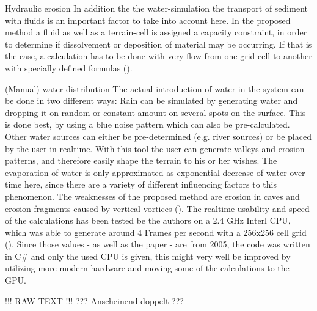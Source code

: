 Hydraulic erosion
In addition the the water-simulation the transport of sediment with fluids is an important factor to take into account here. In the proposed method a fluid as well as a terrain-cell is assigned a capacity constraint, in order to determine if dissolvement or deposition of material may be occurring. If that is the case, a calculation has to be done with very flow from one grid-cell to another with specially defined formulas ().

(Manual) water distribution
The actual introduction of water in the system can be done in two different ways:
Rain can be simulated by generating water and dropping it on random or constant amount on several spots on the surface. This is done best, by using a blue noise pattern which can also be pre-calculated.
Other water sources can either be pre-determined (e.g. river sources) or be placed by the user in realtime. With this tool the user can generate valleys and erosion patterns, and therefore easily shape the terrain to his or her wishes.
The evaporation of water is only approximated as exponential decrease of water over time here, since there are a variety of different influencing factors to this phenomenon. The weaknesses of the proposed method are erosion in caves and erosion fragments caused by vertical vortices ().
The realtime-usability and speed of the calculations has been tested be the authors on a 2.4 GHz Interl CPU, which was able to generate around 4 Frames per second with a 256x256 cell grid (). Since those values - as well as the paper -  are from 2005, the code was written in C\# and only the used CPU is given, this might very well be improved by utilizing more modern hardware and moving some of the calculations to the GPU.

!!! RAW TEXT !!!
??? Anscheinend doppelt ???


